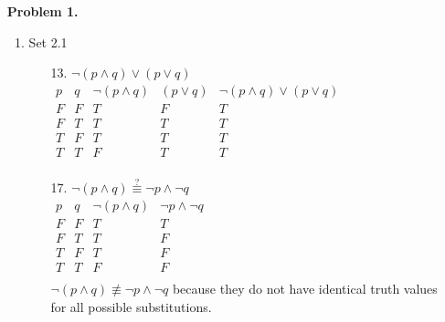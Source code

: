 \documentclass{article}
\begin{document}
	\begin{enumerate} 
		\item [] \textbf{Problem 1.}
		\begin{enumerate}
			\item Set 2.1 
			\begin{itemize}
				\item [13.] 
				$\neg \left( p \wedge q \right) \vee \left( p \vee q \right)$ \\
				$\begin{array}{c|c|c|c|c}
					p & q & \neg \left( p \wedge q \right) & \left( p \vee q \right) & \neg \left( p \wedge q \right) \vee \left( p \vee q \right) \\ \hline
					F & F & T & F & T \\ \hline
					F & T & T & T & T \\ \hline
					T & F & T & T & T \\ \hline
					T & T & F & T & T \\ 
				\end{array}$
				\item [17.]
				$\neg \left( p \wedge q \right) \stackrel{?}{\equiv} \neg p \wedge \neg q$ \\
				$\begin{array}{c|c|c|c}
					p & q & \neg \left( p \wedge q \right) & \neg p \wedge \neg q \\ \hline
					F & F & T & T \\ \hline
					F & T & T & F \\ \hline
					T & F & T & F \\ \hline
					T & T & F & F \\ 
				\end{array}$ \\
				$\neg \left( p \wedge q \right) \not\equiv \neg p \wedge \neg q$ because they do not have identical truth values for all possible substitutions.
			\end{itemize}
			

\end{enumerate}
\end{enumerate}
\end{document}
